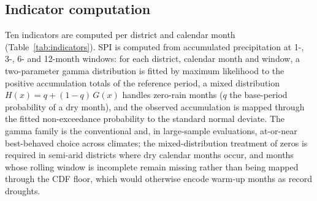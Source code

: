 \documentclass[10pt,a4paper]{article}
\begin{document}
\subsection*{Indicator computation}
Ten indicators are computed per district and calendar month (Table~\ref{tab:indicators}). SPI is computed from accumulated precipitation at 1-, 3-, 6- and 12-month windows\citep{McKee1993}: for each district, calendar month and window, a two-parameter gamma distribution is fitted by maximum likelihood to the positive accumulation totals of the reference period, a mixed distribution $H(x) = q + (1-q)\,G(x)$ handles zero-rain months ($q$ the base-period probability of a dry month), and the observed accumulation is mapped through the fitted non-exceedance probability to the standard normal deviate. The gamma family is the conventional and, in large-sample evaluations, at-or-near best-behaved choice across climates\citep{Stagge2015}; the mixed-distribution treatment of zeros is required in semi-arid districts where dry calendar months occur, and months whose rolling window is incomplete remain missing rather than being mapped through the CDF floor, which would otherwise encode warm-up months as record droughts.
\end{document}
